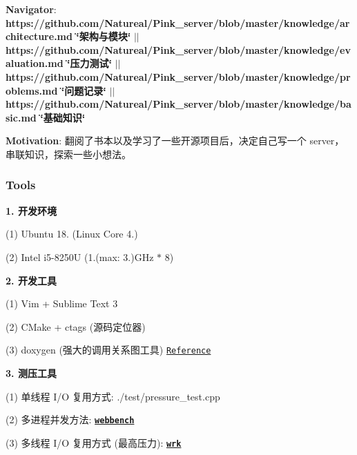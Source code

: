 {\bfseries Navigator}\+: {\bfseries https\+://github.com/\+Natureal/\+Pink\+\_\+server/blob/master/knowledge/architecture.\+md \char`\"{}架构与模块\char`\"{}} $\vert$$\vert$ {\bfseries https\+://github.com/\+Natureal/\+Pink\+\_\+server/blob/master/knowledge/evaluation.\+md \char`\"{}压力测试\char`\"{}} $\vert$$\vert$ {\bfseries https\+://github.com/\+Natureal/\+Pink\+\_\+server/blob/master/knowledge/problems.\+md \char`\"{}问题记录\char`\"{}} $\vert$$\vert$ {\bfseries https\+://github.com/\+Natureal/\+Pink\+\_\+server/blob/master/knowledge/basic.\+md \char`\"{}基础知识\char`\"{}}

{\bfseries Motivation}\+: 翻阅了书本以及学习了一些开源项目后，决定自己写一个 server，串联知识，探索一些小想法。 



\subsubsection*{Tools}


\begin{DoxyItemize}
\item {\bfseries 1. 开发环境}
\end{DoxyItemize}

(1) Ubuntu 18. (Linux Core 4.)

(2) Intel i5-\/8250U (1.(max\+: 3.)G\+Hz $\ast$ 8)


\begin{DoxyItemize}
\item {\bfseries 2. 开发工具}
\end{DoxyItemize}

(1) Vim + Sublime Text 3

(2) C\+Make + ctags (源码定位器)

(3) doxygen (强大的调用关系图工具) \href{https://blog.csdn.net/ZeroLiko/article/details/78162408}{\tt Reference}


\begin{DoxyItemize}
\item {\bfseries 3. 测压工具}
\end{DoxyItemize}

(1) 单线程 I/O 复用方式\+: ./test/pressure\+\_\+test.cpp

(2) 多进程并发方法\+: {\bfseries \href{http://home.tiscali.cz/~cz210552/webbench.html}{\tt webbench}}

(3) 多线程 I/O 复用方式 (最高压力)\+: {\bfseries \href{https://github.com/wg/wrk}{\tt wrk}} 



